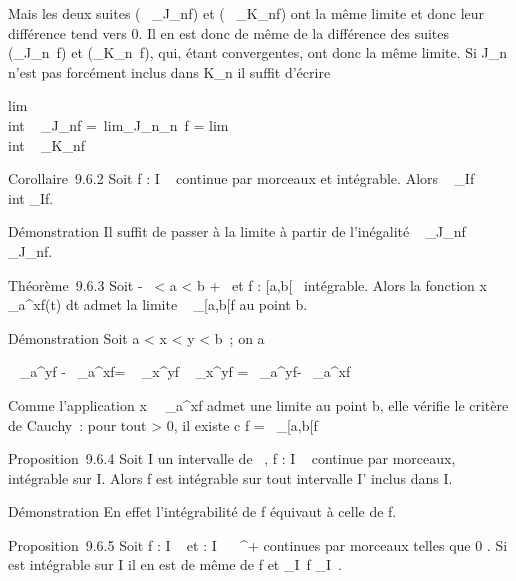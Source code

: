 \documentclass[]{article}
\begin{document}
Mais les deux suites (\int ~
_J_nf) et
(\int ~
_K_nf) ont la même limite et donc
leur différence tend vers 0. Il en est donc de même de la différence des
suites (\int  _J_n~f) et
(\int  _K_n~f), qui, étant
convergentes, ont donc la même limite. Si J_n n'est pas
forcément inclus dans K_n il suffit d'écrire

lim\\int ~
_J_nf =\
lim\int  _J_n\cupK_n~f
= lim\\int ~
_K_nf

Corollaire~9.6.2 Soit f : I \rightarrow~  continue par morceaux et intégrable.
Alors \left \int ~
_If\right \leq\\int
 _If.

Démonstration Il suffit de passer à la limite à partir de l'inégalité
\left \int ~
_J_nf\right 
\leq\int ~
_J_nf.

Théorème~9.6.3 Soit -\infty~ < a < b \leq +\infty~ et f :
[a,b[\rightarrow~  intégrable. Alors la fonction
x\mapsto~\int ~
_a^xf(t) dt admet la limite \int ~
_[a,b[f au point b.

Démonstration Soit a < x < y < b~; on a

\left \int ~
_a^yf -\int ~
_a^xf\right  =
\left \int ~
_x^yf\right
\leq\int ~
_x^yf =\int ~
_a^yf-\int ~
_a^xf

Comme l'application
x\mapsto~\int ~
_a^xf admet une limite au point b,
elle vérifie le critère de Cauchy~: pour tout \epsilon > 0, il
existe c \in [a,b[ tel que c < x < y < b
\rigtharrow~\left \int ~
_a^yf-\int ~
_a^xf\right 
< \epsilon~; alors l'inégalité ci dessus montre que
x\mapsto~\int ~
_a^xf(t) dt vérifie également ce critère de Cauchy, donc
admet une limite au point b. Soit alors b_n une suite
croissante de limite b. On a

lim_x\rightarrow~b\\int ~
_a^xf(t) dt = lim_
n\rightarrow~+\infty~\int  _a^b_n ~f(t)
dt =\
lim_n\rightarrow~+\infty~\int ~
_[a,b_n]f =\int ~
_[a,b[f

Proposition~9.6.4 Soit I un intervalle de ~, f : I \rightarrow~  continue par
morceaux, intégrable sur I. Alors f est intégrable sur tout intervalle
I' inclus dans I.

Démonstration En effet l'intégrabilité de f équivaut à celle de
f.

Proposition~9.6.5 Soit f : I \rightarrow~  et \phi : I \rightarrow~ ~^+ continues par
morceaux telles que 0 \leqf\leq \phi. Si \phi est intégrable sur
I il en est de même de f et \left
\int  _I~f\right
\leq\int  _I~\phi.
\end{document}
